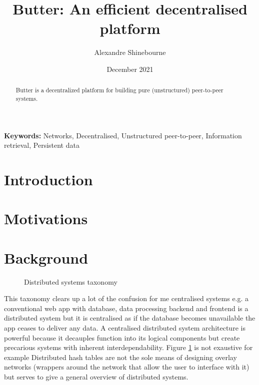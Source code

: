 \documentclass[a4paper]{article}
\title{Butter: An efficient decentralised platform}
\author{Alexandre Shinebourne}
\date{December 2021}
\begin{document}
\maketitle


\begin{abstract}
    Butter is a decentralized platform for building pure (unstructured) peer-to-peer systems.
\end{abstract}

\textbf{Keywords:} Networks, Decentralised, Unstructured peer-to-peer, Information retrieval, Persistent data

\tableofcontents

\section{Introduction}

\section{Motivations}

\section{Background}
\begin{figure}
    \centering
    
    \caption{Distributed systems taxonomy}
    \label{fig:dis-taxonomy}
\end{figure}

This taxonomy clears up a lot of the confusion for me centralised systems e.g. a conventional web app with database, data processing backend and frontend is a distributed system but it is centralised as if the database becomes unavailable the app ceases to deliver any data. A centralised distributed system architecture is powerful because it decauples function into its logical components but create precarious systems with inherent interdependability.
Figure \ref{fig:dis-taxonomy} is not exaustive for example Distributed hash tables are not the sole means of designing overlay networks (wrappers around the network that allow the user to interface with it) but serves to give a general overview of distributed systems.
\end{document}
